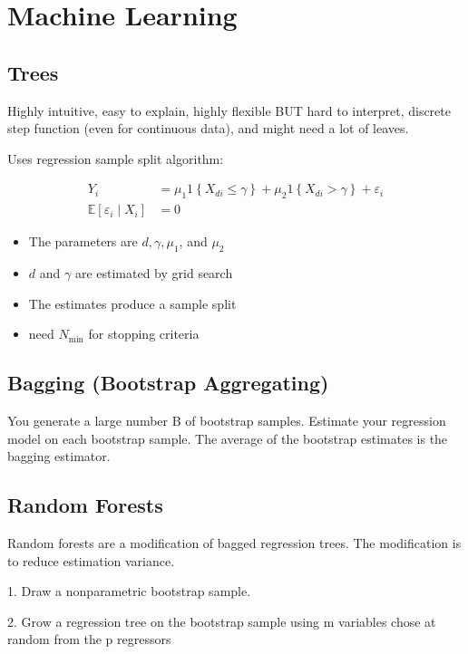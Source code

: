 \section{Machine Learning}

\subsection{Trees}

Highly intuitive, easy to explain, highly flexible BUT hard to interpret, discrete step function (even for continuous data), and might need a lot of leaves.

Uses regression sample split algorithm:

\begin{align*}
    Y_i &= \mu_1 1\left\{X_{d i} \leq \gamma\right\}+\mu_2 1\left\{X_{d i}>\gamma\right\}+\varepsilon_i\\
    \mathbb{E}\left[\varepsilon_i \mid X_i\right] &= 0
\end{align*}

\begin{itemize}
    \item The parameters are $d, \gamma, \mu_1$, and $\mu_2$
    \item $d$ and $\gamma$ are estimated by grid search
    \item The estimates produce a sample split
    \item need $N_{\text{min}}$ for stopping criteria
\end{itemize}

\subsection{Bagging (Bootstrap Aggregating)}

You generate a large number B of bootstrap samples.
Estimate your regression model on each bootstrap sample.
The average of the bootstrap estimates is the bagging estimator.

\subsection{Random Forests}

Random forests are a modification of bagged regression trees. The modification is to reduce estimation variance. 

1. Draw a nonparametric bootstrap sample.

2. Grow a regression tree on the bootstrap sample using m variables chose at random from the p regressors

